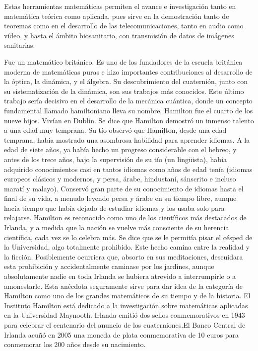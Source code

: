 \begin{parchment}
{Estas herramientas matemáticas permiten el avance e investigación tanto en matemática teórica como aplicada, pues sirve en la demostración tanto de teoremas como en el desarrollo de las telecomunicaciones, tanto en audio como vídeo, y hasta el ámbito biosanitario, con transmisión de datos de imágenes sanitarias.}
\end{parchment}


\begin{parchment}{ Fue un matemático británico. Es uno de los fundadores de la escuela británica moderna de matemáticas puras e hizo importantes contribuciones al desarrollo de la óptica, la dinámica, y el álgebra. Su descubrimiento del cuaternión, junto con su sistematización de la dinámica, son sus trabajos más conocidos. Este último trabajo sería decisivo en el desarrollo de la mecánica cuántica, donde un concepto fundamental llamado hamiltoniano lleva su nombre.
Hamilton fue el cuarto de los nueve hijos. Vivían en Dublín. Se dice que Hamilton demostró un inmenso talento a una edad muy temprana. 
Su tío observó que Hamilton, desde una edad temprana, había mostrado una asombrosa habilidad para aprender idiomas. A la edad de siete años, ya había hecho un progreso considerable con el hebreo, y antes de los trece años, bajo la supervisión de su tío (un lingüista), había adquirido conocimientos casi en tantos idiomas como años de edad tenía (idiomas europeos clásicos y modernos, y persa, árabe, hindustaní, sánscrito e incluso maratí y malayo). Conservó gran parte de su conocimiento de idiomas hasta el final de su vida, a menudo leyendo persa y árabe en su tiempo libre, aunque hacía tiempo que había dejado de estudiar idiomas y los usaba solo para relajarse.
Hamilton es reconocido como uno de los científicos más destacados de Irlanda, y a medida que la nación se vuelve más consciente de su herencia científica, cada vez se lo celebra más. Se dice que se le permitía pisar el césped de la Universidad, algo totalmente prohibido. Este hecho camina entre la realidad y la ficción. Posiblemente ocurriera que, absorto en sus meditaciones, descuidara esta prohibición y accidentalmente caminase por los jardines, aunque absolutamente nadie en toda Irlanda se hubiera atrevido a interrumpirle o a amonestarle. Esta anécdota seguramente sirve para dar idea de la categoría de Hamilton como uno de los grandes matemáticos de su tiempo y de la historia.
El Instituto Hamilton está dedicado a la investigación sobre matemáticas aplicadas en la Universidad Maynooth. 
Irlanda emitió dos sellos conmemorativos en 1943 para celebrar el centenario del anuncio de los cuaterniones.El Banco Central de Irlanda acuñó en 2005 una moneda de plata conmemorativa de 10 euros para conmemorar los 200 años desde su nacimiento.
}
\end{parchment}
